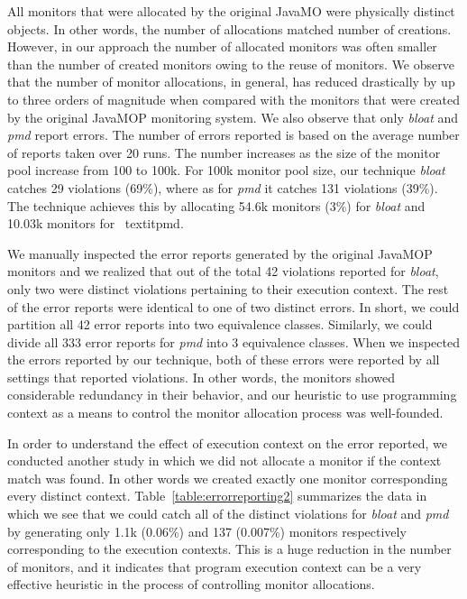 All monitors that were allocated by the original JavaMO were physically distinct 
objects. In other words, the number of allocations matched number of creations. 
However, in our approach the number of allocated monitors was often smaller than 
the number of created monitors owing to the reuse of monitors. We observe that 
the number of monitor allocations, in general, has reduced drastically by up to 
three orders of magnitude when compared with the monitors that were created by 
the original JavaMOP monitoring system. We also observe that only \textit{bloat} 
and \textit{pmd} report errors. The number of errors reported is based on the 
average number of reports taken over 20 runs. The number increases as the size 
of the monitor pool increase from 100 to 100k. For 100k monitor pool size, our 
technique \textit{bloat} catches 29 violations (69\%), where as for \textit{pmd} 
it catches 131 violations (39\%). The technique achieves this by allocating 
54.6k monitors (3\%) for \textit{bloat} and 10.03k monitors for \
textit{pmd}.

We manually inspected the error reports generated by the original JavaMOP 
monitors and we realized that out of the total 42 violations reported for 
\textit{bloat}, only two were distinct violations pertaining to their execution 
context. The rest of the error reports were identical to one of two distinct 
errors. In short, we could partition all 42 error reports into two equivalence 
classes. Similarly, we could divide all 333 error reports for \textit{pmd} into 
3 equivalence classes. When we inspected the errors reported by our technique, 
both of these errors were reported by all settings that reported violations. In 
other words, the monitors showed considerable redundancy in their behavior, and 
our heuristic to use programming context as a means to control the monitor 
allocation process was well-founded.

In order to understand the effect of execution context on the error reported, we 
conducted another study in which we did not allocate a monitor if the context 
match was found. In other words we created exactly one monitor corresponding 
every distinct context. Table~\ref{table:errorreporting2} summarizes the data in 
which we see that we could catch all of the distinct violations for 
\textit{bloat} and \textit{pmd} by generating only 1.1k (0.06\%) and 137 
(0.007\%) monitors respectively corresponding to the execution contexts. This is 
a huge reduction in the number of monitors, and it indicates that program 
execution context can be a very effective heuristic in the process of 
controlling monitor allocations.

